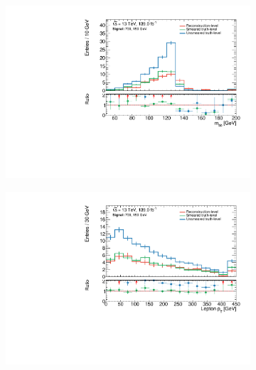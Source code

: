 \begin{figure}
\begin{subfigure}[b]{0.45\linewidth}
	\end{subfigure}\hfill
	\begin{subfigure}[b]{0.45\linewidth}
		\centering\includegraphics[width=\textwidth]{mbb_C1N2_Wh_hbb_700p0_150p0_smeared.pdf}
	\end{subfigure}\hfill
	\begin{subfigure}[b]{0.45\linewidth}
		\centering\includegraphics[width=\textwidth]{lep1Pt_C1N2_Wh_hbb_700p0_150p0_smeared.pdf}
	\end{subfigure}\hfill
	\begin{subfigure}[b]{0.45\linewidth}

\end{subfigure}
\end{figure}
